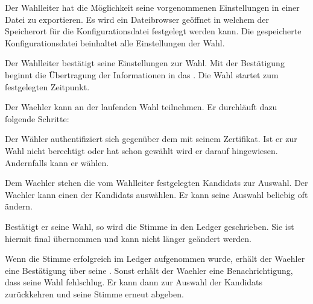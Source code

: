 \documentclass[parskip=full,11pt,twoside]{scrartcl}
\begin{document}
Der \gls{Wahlleiter} hat die Möglichkeit seine vorgenommenen Einstellungen in einer Datei zu exportieren.
Es wird ein \gls{Dateibrowser} geöffnet in welchem der Speicherort für die Konfigurationsdatei festgelegt werden kann.
Die gespeicherte Konfigurationsdatei beinhaltet alle Einstellungen der \gls{Wahl}.

\pagebreak

Der \gls{Wahlleiter} bestätigt seine Einstellungen zur \gls{Wahl}. Mit der Bestätigung beginnt die Übertragung der Informationen in das . Die \gls{Wahl} startet zum festgelegten Zeitpunkt.

Der \gls{Waehler} kann an der laufenden \gls{Wahl} teilnehmen. Er durchläuft dazu folgende Schritte:

Der Wähler authentifiziert sich gegenüber dem  mit seinem \gls{Zertifikat}.
Ist er zur \gls{Wahl} nicht berechtigt oder hat schon gewählt wird er darauf hingewiesen.
Andernfalls kann er wählen.

Dem \gls{Waehler} stehen die vom \gls{Wahlleiter} festgelegten \glspl{Kandidat} zur Auswahl.
Der \gls{Waehler} kann einen der \glspl{Kandidat} auswählen.
Er kann seine Auswahl beliebig oft ändern.

Bestätigt er seine \gls{Wahl}, so wird die \gls{Stimme} in den \gls{Ledger} geschrieben.
Sie ist hiermit final übernommen und kann nicht länger geändert werden.

Wenn die \gls{Stimme} erfolgreich im \gls{Ledger} aufgenommen wurde, erhält der \gls{Waehler} eine Bestätigung über seine .
Sonst erhält der \gls{Waehler} eine Benachrichtigung, dass seine \gls{Wahl} fehlschlug.
Er kann dann zur Auswahl der \glspl{Kandidat} zurückkehren und seine \gls{Stimme} erneut abgeben.
\end{document}
